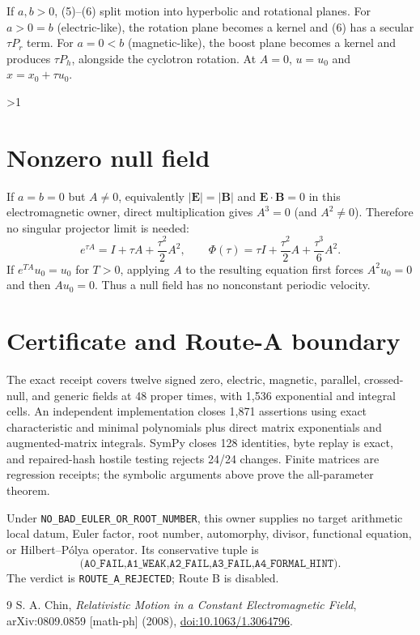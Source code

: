 \documentclass[10pt]{article}
\providecommand{\CRevisionRound}{2}
\begin{document}
If $a,b>0$, (5)--(6) split motion into hyperbolic and rotational planes.
For $a>0=b$ (electric-like), the rotation plane becomes a kernel and (6)
has a secular $\tau P_r$ term.  For $a=0<b$ (magnetic-like), the boost plane
becomes a kernel and produces $\tau P_h$, alongside the cyclotron rotation.
At $A=0$, $u=u_0$ and $x=x_0+\tau u_0$.
\fi

\ifnum\CRevisionRound>1
\section{Nonzero null field}
If $a=b=0$ but $A\ne0$, equivalently
$|\mathbf E|=|\mathbf B|$ and $\mathbf E\cdot\mathbf B=0$ in this
electromagnetic owner, direct multiplication gives $A^3=0$ (and $A^2\ne0$).
Therefore no singular projector limit is needed:
\begin{equation}
 e^{\tau A}=I+\tau A+\frac{\tau^2}{2}A^2,\qquad
 \Phi(\tau)=\tau I+\frac{\tau^2}{2}A+\frac{\tau^3}{6}A^2.   \tag{8}
\end{equation}
If $e^{TA}u_0=u_0$ for $T>0$, applying $A$ to the resulting equation first
forces $A^2u_0=0$ and then $Au_0=0$.  Thus a null field has no nonconstant
periodic velocity.

\section{Certificate and Route-A boundary}
The exact receipt covers twelve signed zero, electric, magnetic, parallel,
crossed-null, and generic fields at 48 proper times, with 1,536 exponential
and integral cells.  An independent implementation closes 1,871 assertions
using exact characteristic and minimal polynomials plus direct matrix
exponentials and augmented-matrix integrals.  SymPy closes 128 identities,
byte replay is exact, and repaired-hash hostile testing rejects 24/24 changes.
Finite matrices are regression receipts; the symbolic arguments above prove
the all-parameter theorem.

Under \texttt{NO\_BAD\_EULER\_OR\_ROOT\_NUMBER}, this owner supplies no
target arithmetic local datum, Euler factor, root number, automorphy, divisor,
functional equation, or Hilbert--P\'olya operator.  Its conservative tuple is
\[
\texttt{(A0\_FAIL,A1\_WEAK,A2\_FAIL,A3\_FAIL,A4\_FORMAL\_HINT)}.
\]
The verdict is \texttt{ROUTE\_A\_REJECTED}; Route B is disabled.
\fi

\begin{thebibliography}{9}
 S. A. Chin, \emph{Relativistic Motion in a Constant
Electromagnetic Field}, arXiv:0809.0859 [math-ph] (2008),
\href{https://doi.org/10.1063/1.3064796}{doi:10.1063/1.3064796}.
\end{thebibliography}
\end{document}
